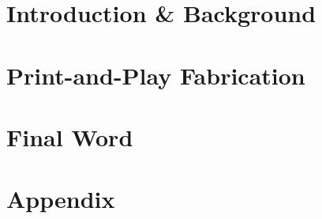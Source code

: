 \documentclass[ oneside,openright,titlepage,numbers=noenddot,%
                headinclude,footinclude,cleardoublepage=empty,abstract=on,
                BCOR=5mm,paper=a4,fontsize=11pt
                ]{scrreprt}
\begin{document}
	\frenchspacing
	\raggedbottom
	\pagestyle{plain}

	
	\cleardoublepage
	\cleardoublepage
	\cleardoublepage
	\cleardoublepage
	\cleardoublepage
	\cleardoublepage
	
	\cleardoublepage
	\pagestyle{scrheadings}
	\cleardoublepage
	\part{Introduction \& Background}
		\label{pt:background}
			
		\cleardoublepage
	\part{Print-and-Play Fabrication} 
		\label{pt:print-and-play}
			
	\part{Final Word}
		\label{pt:implications}
			

	\cleardoublepage
	\part{Appendix}
	\cleardoublepage
	\cleardoublepage
\end{document}
